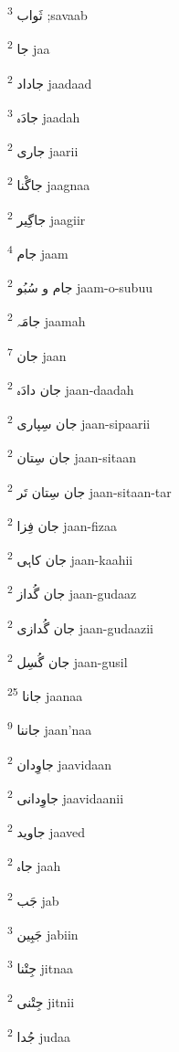 \documentclass[12pt]{article}
\begin{document}
\begin{multicols}{5}
{\ur ثَواب}   \textsuperscript{3} ;savaab

{\ur جا}   \textsuperscript{2} jaa

{\ur جاداد}   \textsuperscript{2} jaadaad

{\ur جادَہ}   \textsuperscript{3} jaadah

{\ur جاری}   \textsuperscript{2} jaarii

{\ur جاگْنا}   \textsuperscript{2} jaagnaa

{\ur جاگِیر}   \textsuperscript{2} jaagiir

{\ur جام}   \textsuperscript{4} jaam

{\ur جام و سُبُو}   \textsuperscript{2} jaam-o-subuu

{\ur جامَہ}   \textsuperscript{2} jaamah

{\ur جان}   \textsuperscript{7} jaan

{\ur جان دادَہ}   \textsuperscript{2} jaan-daadah

{\ur جان سِپاری}   \textsuperscript{2} jaan-sipaarii

{\ur جان سِتان}   \textsuperscript{2} jaan-sitaan

{\ur جان سِتان تَر}   \textsuperscript{2} jaan-sitaan-tar

{\ur جان فِزا}   \textsuperscript{2} jaan-fizaa

{\ur جان کاہی}   \textsuperscript{2} jaan-kaahii

{\ur جان گُداز}   \textsuperscript{2} jaan-gudaaz

{\ur جان گُدازی}   \textsuperscript{2} jaan-gudaazii

{\ur جان گُسِل}   \textsuperscript{2} jaan-gusil

{\ur جانا}   \textsuperscript{25} jaanaa

{\ur جاننا}   \textsuperscript{9} jaan'naa

{\ur جاوِدان}   \textsuperscript{2} jaavidaan

{\ur جاوِدانی}   \textsuperscript{2} jaavidaanii

{\ur جاوید}   \textsuperscript{2} jaaved

{\ur جاہ}   \textsuperscript{2} jaah

{\ur جَب}   \textsuperscript{2} jab

{\ur جَبِین}   \textsuperscript{3} jabiin

{\ur جِتْنا}   \textsuperscript{3} jitnaa

{\ur جِتْنی}   \textsuperscript{2} jitnii

{\ur جُدا}   \textsuperscript{2} judaa


\end{multicols}
\end{document}
